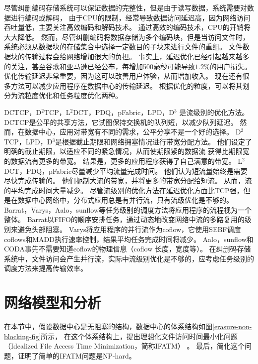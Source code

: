 尽管纠删编码存储系统可以保证数据的完整性，但是由于读写数据，系统需要对数据进行编码或解码，
由于CPU的限制，经常导致数据访问延迟高，因为网络访问吞吐量低，\cite{dimakis606049decentralized,lin2012secure,dimakis2010network}主要关注高效编码和解码技术。
通过高效的编码技术，CPU的开销将大大降低。
然而，尽管纠删编码将数据存储为多个编码块，但是当访问文件时，系统必须从数据块的存储集合中选择一定数目的子块来进行文件的重组。
文件数据块的传输过程会给网络增加很大的负担。
事实上，延迟优化已经引起越来越多的关注，甚至谷歌和亚马逊已经公布，每增加500毫秒可能导致$1.2\%$的用户损失\cite{schurman2009user}。
优化传输延迟非常重要，因为这可以改善用户体验，从而增加收入。
现在还有很多方法可以减少应用程序在数据中心的传输延迟。
根据优化的粒度，可以将其划分为流粒度优化和任务粒度优化两种。

DCTCP\cite{DCTCP}，D$^2$TCP\cite{D2TCP}，L$^2$DCT\cite{L2DCT}，PDQ\cite{PDQ}，pFabric\cite{pFabric}，LPD\cite{LPD}，D$^3$\cite{D3}
是流级别的优化方法。DCTCP是公平的共享方法，它试图保持交换机的队列短，以减少队列延迟。
然而，在数据中心，应用对带宽有不同的需求，公平分享不是一个好的选择\cite{LPD}。 
D$^2$TCP，LPD，D$^3$是根据截止期限和网络拥塞情况进行带宽分配方法。
他们设定了明确的截止期限，以适应不同的紧急情况，从而使期限紧的数据流
获得比期限宽的数据流有更多的带宽。
结果是，更多的应用程序获得了自己满意的带宽。 
L$^2$DCT，PDQ，pFabric尽量减少平均流量完成时间。
他们认为短流量始终是需要尽快完成传输的。
他们扼制大流的带宽，并将更多的带宽分配给短流。
从而，流的平均完成时间大量减少。
尽管流级别的优化方法在延迟优化方面比TCP强，但是在数据中心网络中，分布式应用总是有并行流，只有流级优化是不够的。 
Barrat\cite{dogar2014decentralized}，Varys\cite{chowdhury2014efficient}，Aalo\cite{chowdhury2015efficient}，sunflow\cite{huang2016sunflow}等任务级别的调度方法将应用程序的流程视为一个整体。 
Barrat\cite{dogar2014decentralized}以FIFO的顺序安排任务，通过动态地改变网络中流的多路复用的级别来避免头部阻塞。 
Varys\cite{chowdhury2014efficient}将应用程序的并行流作为coflow，它使用SEBF调度coflows和MADD执行速率控制，结果平均任务完成时间将减少。 
Aalo\cite{chowdhury2015efficient}，sunflow\cite{huang2016sunflow}和CODA\cite{zhang2016coda}事先不需要知道coflow的物理信息（coflow 长度，宽度等）。
在纠删码存储系统中，文件访问会产生并行流，实际中流级别优化是不够的，应考虑任务级别的调度方法来提高传输效率。


\section{网络模型和分析}
\label{erasure_coding:networkmodel}
在本节中，假设数据中心是无阻塞的结构，数据中心的体系结构如图\ref{erasure-non-blocking-fig}所示，
在这个体系结构上，提出理想化文件访问时间最小化问题（Idealized File Access Time Minimization，简称IFATM） 。
最后，简化这个问题，证明了简单的IFATM问题是NP-hard。

